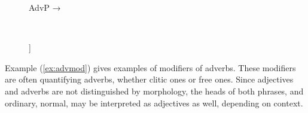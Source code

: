 \begin{figure}[h]
\ex\label{ex:advpstruct}
AdvP →  
\xe
\end{figure}

\begin{figure}[h]
\ex~\label{ex:advpcstruct}
\begin{forest}
[{\anno[\elem{\Adjc}]{AdvP}}
		[\anno{\xhead{Adv}}]
		[{\anno[{\elem{\Adjc}}]{AdvP}}]
]
\end{forest}
\xe
\end{figure}

Example (\ref{ex:advmod}) gives examples of modifiers of adverbs. These
modifiers are often quantifying adverbs, whether clitic ones or free ones. 
Since adjectives and adverbs are not distinguished by morphology, 
the heads of both phrases,  and 
{ordinary, normal}, may be interpreted as adjectives as well, depending on
context.

